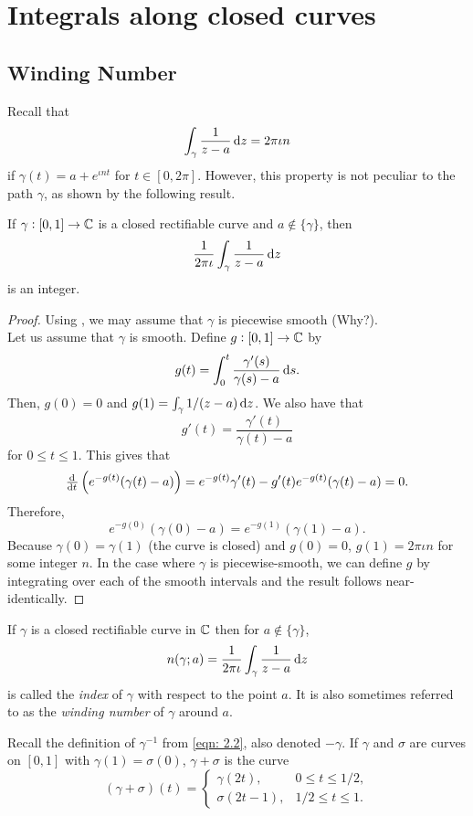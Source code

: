 \section{Integrals along closed curves}

	\subsection{Winding Number}

		Recall that
		\[ \int_\gamma \frac{1}{z-a} \dif z  = 2 \pi \iota n \]
		if $\gamma(t) = a + e^{\iota n t}$ for $t \in [0,2\pi]$. However, this property is not peculiar to the path $\gamma$, as shown by the following result.

		\begin{ftheo}
			If $\gamma : [0,1] \to \mathbb{C}$ is a closed rectifiable curve and $a \not\in \{\gamma\}$, then
			\[ \frac{1}{2\pi\iota} \int_\gamma \frac{1}{z-a} \dif z \]
			is an integer.
		\end{ftheo}
		\begin{proof}
			Using , we may assume that $\gamma$ is piecewise smooth (Why?). \\
			Let us assume that $\gamma$ is smooth.
			Define $g : [0,1] \to \mathbb{C}$ by
			\[ g(t) = \int_0^t \frac{\gamma'(s)}{\gamma(s) - a} \dif s. \]
			Then, $g(0) = 0$ and $g(1) = \int_\gamma 1/(z-a) \dif z$. We also have that
			\[ g'(t) = \frac{\gamma'(t)}{\gamma(t) - a} \]
			for $0 \le t \le 1$. This gives that
			\[ \od{}{t} \left(e^{-g(t)}(\gamma(t) - a)\right) = e^{-g(t)} \gamma'(t) - g'(t) e^{-g(t)} (\gamma(t)-a) = 0. \]
			Therefore,
			\[ e^{-g(0)} (\gamma(0) - a) = e^{-g(1)} (\gamma(1) - a). \]
			Because $\gamma(0) = \gamma(1)$ (the curve is closed) and $g(0) = 0$, $g(1) = 2\pi\iota n$ for some integer $n$.
			In the case where $\gamma$ is piecewise-smooth, we can define $g$ by integrating over each of the smooth intervals and the result follows near-identically.
		\end{proof}

		\begin{fdef}
			If $\gamma$ is a closed rectifiable curve in $\mathbb{C}$ then for $a \not\in \{\gamma\}$,
			\[ n(\gamma;a) = \frac{1}{2\pi\iota} \int_\gamma \frac{1}{z-a} \dif z \]
			is called the \emph{index} of $\gamma$ with respect to the point $a$. It is also sometimes referred to as the \emph{winding number} of $\gamma$ around $a$.
		\end{fdef}
		Recall the definition of $\gamma^{-1}$ from \eqref{eqn: 2.2}, also denoted $-\gamma$. If $\gamma$ and $\sigma$ are curves on $[0,1]$ with $\gamma(1) = \sigma(0)$, $\gamma+\sigma$ is the curve
		\[ (\gamma+\sigma)(t) = \begin{cases} \gamma(2t), & 0 \le t \le 1/2, \\ \sigma(2t-1), & 1/2 \le t \le 1. \end{cases} \]

